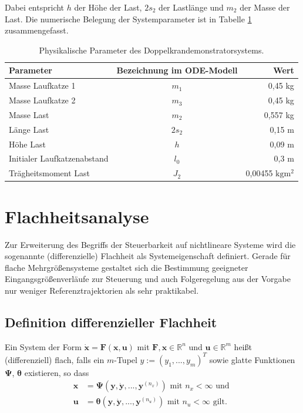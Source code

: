 Dabei entspricht $h$ der Höhe der Last, $2 s_2$ der Lastlänge und $m_2$ der Masse der Last. Die numerische Belegung der Systemparameter ist in Tabelle \ref{tab:sys_params} zusammengefasst.

\begin{table}[htbp]%
	\centering
	\caption{Physikalische Parameter des Doppelkrandemonstratorsystems.}
	\label{tab:sys_params}
	\begin{tabular}{l c r} 
		\toprule
		Parameter & Bezeichnung im ODE-Modell & Wert \\ 
		\hline
		Masse Laufkatze 1 & $m_1$ & 0,45 \si{\kg} \\
		Masse Laufkatze 2 & $m_3$ & 0,45 \si{\kg} \\
 		Masse Last & $m_2$ & 0,557 \si{\kg} \\
		Länge Last & $2 s_2$ & 0,15 \si{\m} \\
		Höhe Last & $h$ & 0,09 \si{\m} \\
		Initialer Laufkatzenabstand & $l_0$ & 0,3 \si{\m} \\
		Trägheitsmoment Last & $J_2$ & 0,00455 $\si{\kg\m^2}$ \\
		\bottomrule
	\end{tabular}
\end{table}

\chapter{Flachheitsanalyse}
Zur Erweiterung des Begriffs der Steuerbarkeit auf nichtlineare Systeme wird die sogenannte (differenzielle) Flachheit als Systemeigenschaft definiert. Gerade für flache Mehrgrößensysteme gestaltet sich die Bestimmung geeigneter Eingangsgrößenverläufe zur Steuerung und auch Folgeregelung aus der Vorgabe nur weniger Referenztrajektorien als sehr praktikabel.

\section{Definition differenzieller Flachheit}\label{sec:Def_flatness}

Ein System der Form $\dot{\mathbf{x}} = \mathbf{F}(\mathbf{x}, \mathbf{u})$ mit $\mathbf{F}, \mathbf{x} \in \mathbb{R}^n$ und $\mathbf{u} \in \mathbb{R}^m$ heißt (differenziell) flach, falls ein $m$-Tupel $y := (y_1, ..., y_m)^T$ sowie glatte Funktionen $\mathbf{\Psi}$, $\boldsymbol{\theta}$ existieren, so dass
\begin{subequations}
\label{eq:general_flat_sys}
\begin{align}
\mathbf{x} &= \mathbf{\Psi}(\mathbf{y}, \dot{\mathbf{y}}, ..., \mathbf{y}^{(n_x)}) \text{ mit } n_x < \infty \text{ und } \\
\mathbf{u} &= \boldsymbol{\theta}(\mathbf{y}, \dot{\mathbf{y}}, ..., \mathbf{y}^{(n_u)}) \text{ mit } n_u < \infty \text{ gilt.}
\end{align}
\end{subequations}

